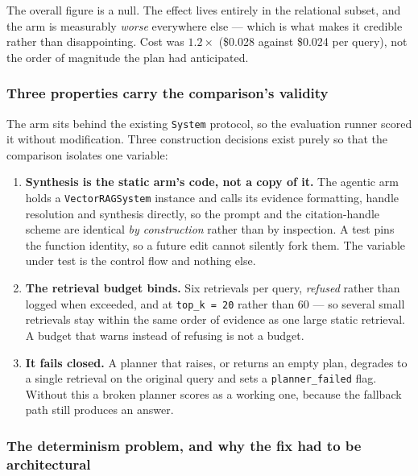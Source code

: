 The overall figure is a null. The effect lives entirely in the relational
subset, and the arm is measurably \emph{worse} everywhere else --- which is
what makes it credible rather than disappointing. Cost was $1.2\times$
(\$0.028 against \$0.024 per query), not the order of magnitude the plan had
anticipated.

\subsubsection*{Three properties carry the comparison's validity}

The arm sits behind the existing \texttt{System} protocol, so the evaluation
runner scored it without modification. Three construction decisions exist
purely so that the comparison isolates one variable:

\begin{enumerate}[label=\arabic*.]
  \item \textbf{Synthesis is the static arm's code, not a copy of it.} The
        agentic arm holds a \texttt{VectorRAGSystem} instance and calls its
        evidence formatting, handle resolution and synthesis directly, so the
        prompt and the citation-handle scheme are identical \emph{by
        construction} rather than by inspection. A test pins the function
        identity, so a future edit cannot silently fork them. The variable
        under test is the control flow and nothing else.
  \item \textbf{The retrieval budget binds.} Six retrievals per query,
        \emph{refused} rather than logged when exceeded, and at
        \texttt{top\_k = 20} rather than 60 --- so several small retrievals
        stay within the same order of evidence as one large static retrieval.
        A budget that warns instead of refusing is not a budget.
  \item \textbf{It fails closed.} A planner that raises, or returns an empty
        plan, degrades to a single retrieval on the original query and sets a
        \texttt{planner\_failed} flag. Without this a broken planner scores as
        a working one, because the fallback path still produces an answer.
\end{enumerate}

\subsubsection*{The determinism problem, and why the fix had to be architectural}

